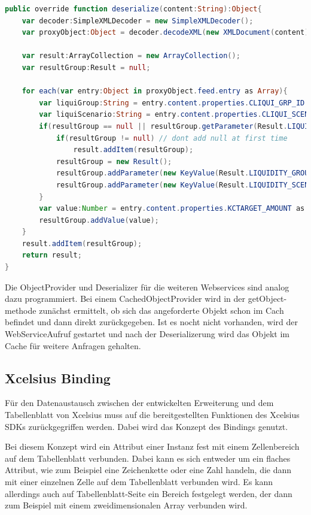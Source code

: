 \begin{programm}[h] %
\begin{lstlisting}[language=ActionScript]
public override function deserialize(content:String):Object{			
	var decoder:SimpleXMLDecoder = new SimpleXMLDecoder();
	var proxyObject:Object = decoder.decodeXML(new XMLDocument(content));
	
	var result:ArrayCollection = new ArrayCollection();
	var resultGroup:Result = null;			
			
	for each(var entry:Object in proxyObject.feed.entry as Array){
		var liquiGroup:String = entry.content.properties.CLIQUI_GRP_ID as String;
		var liquiScenario:String = entry.content.properties.CLIQUI_SCENARIO as String;
		if(resultGroup == null || resultGroup.getParameter(Result.LIQUIDITY_GROUP) != liquiGroup || resultGroup.getParameter(Result.LIQUIDITY_SCENARIO) != liquiScenario){
			if(resultGroup != null) // dont add null at first time
				result.addItem(resultGroup);
			resultGroup = new Result();
			resultGroup.addParameter(new KeyValue(Result.LIQUIDITY_GROUP,liquiGroup));
			resultGroup.addParameter(new KeyValue(Result.LIQUIDITY_SCENARIO,liquiScenario));
		}
		var value:Number = entry.content.properties.KCTARGET_AMOUNT as Number;
		resultGroup.addValue(value);
	}
	result.addItem(resultGroup);
	return result;
}
\end{lstlisting}
\caption{[TODO]\label{[TODO]}}
\end{programm}

Die ObjectProvider und Deserializer für die weiteren Webservices sind analog dazu programmiert. Bei einem CachedObjectProvider wird in der getObject-methode zunächst ermittelt, ob sich das angeforderte Objekt schon im Cach befindet und dann direkt zurückgegeben. Ist es nocht nicht vorhanden, wird der WebServiceAufruf gestartet und nach der Deserializerung wird das Objekt im Cache für weitere Anfragen gehalten.

\subsection{Xcelsius Binding}
Für den Datenaustausch zwischen der entwickelten Erweiterung und dem Tabellenblatt von Xcelsius muss auf die bereitgestellten Funktionen des Xcelsius SDKs zurückgegriffen werden. Dabei wird das Konzept des Bindings genutzt.

Bei diesem Konzept wird ein Attribut einer Instanz fest mit einem Zellenbereich auf dem Tabellenblatt verbunden. Dabei kann es sich entweder um ein flaches Attribut, wie zum Beispiel eine Zeichenkette oder eine Zahl handeln, die dann mit einer einzelnen Zelle auf dem Tabellenblatt verbunden wird. Es kann allerdings auch auf Tabellenblatt-Seite ein Bereich festgelegt werden, der dann zum Beispiel mit einem zweidimensionalen Array verbunden wird.

